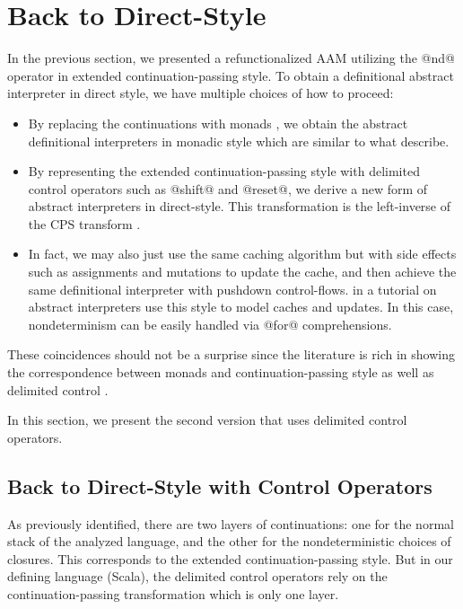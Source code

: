 \documentclass[acmsmall, review]{acmart}\settopmatter{}
\begin{document}
\section{Back to Direct-Style} \label{directstyle}

In the previous section, we presented a refunctionalized AAM utilizing the @nd@ operator
in extended continuation-passing style.
To obtain a definitional abstract interpreter in direct style, we have multiple choices 
of how to proceed:
\begin{itemize}
  \item By replacing the continuations with monads \cite{filinski1994representing}, 
    we obtain the abstract definitional interpreters in monadic style which are similar to what 
    \citet{darais2017abstracting} describe.
  \item By representing the extended continuation-passing style with delimited control operators
    such as @shift@ and @reset@, we derive a new form of abstract interpreters in direct-style.
    This transformation is the left-inverse of the CPS transform \cite{DBLP:journals/scp/Danvy94, DBLP:conf/lfp/DanvyL92}.
  \item In fact, we may also just use the same caching algorithm but with side effects such as
    assignments and mutations to update the cache, and then achieve the same definitional 
    interpreter with pushdown control-flows.  in a tutorial on abstract 
    interpreters use this style to model caches and updates.
    In this case, nondeterminism can be easily handled via @for@ comprehensions. 
\end{itemize}

These coincidences should not be a surprise since the literature is rich
in showing the correspondence between monads and continuation-passing style as well as
delimited control \cite{Danvy:1990:AC:91556.91622, wadler1992essence,
danvy1992representing, moggi1991notions}.

In this section, we present the second version that uses delimited control operators.

\subsection{Back to Direct-Style with Control Operators} \label{uncps}

As previously identified, there are two layers of continuations: one for the normal stack 
of the analyzed language, and the other for the nondeterministic choices of closures.
This corresponds to the extended continuation-passing style.
But in our defining language (Scala), the delimited control operators rely on the continuation-passing 
transformation which is only one layer.
\end{document}
